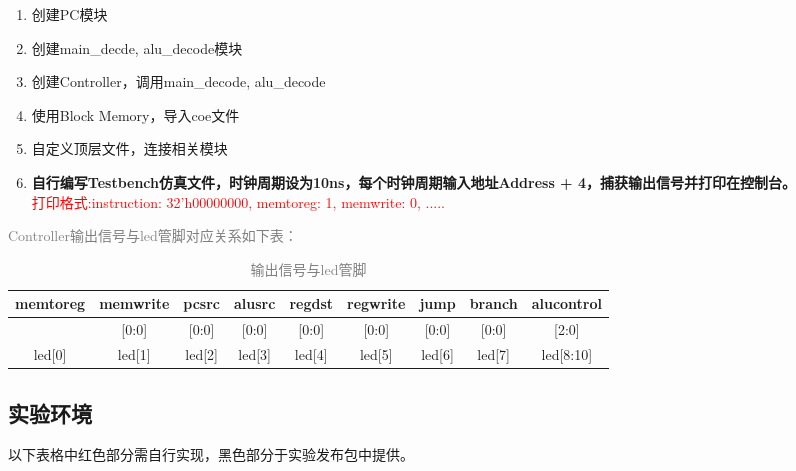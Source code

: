 \begin{enumerate}
    \item 创建PC模块
    \item 创建main\_decde, alu\_decode模块
    \item 创建Controller，调用main\_decode, alu\_decode
    \item 使用Block Memory，导入coe文件
    \item 自定义顶层文件，连接相关模块
    \item \textbf{自行编写Testbench仿真文件，时钟周期设为10ns，每个时钟周期输入地址Address + 4，捕获输出信号并打印在控制台。}\\
        \textcolor{red}{打印格式:instruction: 32'h00000000, memtoreg: 1, memwrite: 0, .....}
\end{enumerate}

\textcolor{gray}{
Controller输出信号与led管脚对应关系如下表：
}
\begin{table}[htbp]
    \centering
    \color{gray}
    \begin{tabular}{c|c|c|c|c|c|c|c|c}
         memtoreg&	memwrite&	pcsrc&	alusrc&	regdst&	regwrite&	jump&	branch&	alucontrol  \\ \hline
         [0:0]&	[0:0]&	[0:0]&	[0:0]&	[0:0]&	[0:0]&	[0:0]&	[0:0]&	[2:0] \\ \hline
         led[0]&	led[1]&	led[2]&	led[3]&	led[4]&	led[5]&	led[6]&	led[7]&	led[8:10] \\ \hline
    \end{tabular}
    \caption{\textcolor{gray}{输出信号与led管脚}}
    \label{tab:controller_sig}
\end{table}





\subsection{实验环境}
以下表格中红色部分需自行实现，黑色部分于实验发布包中提供。

